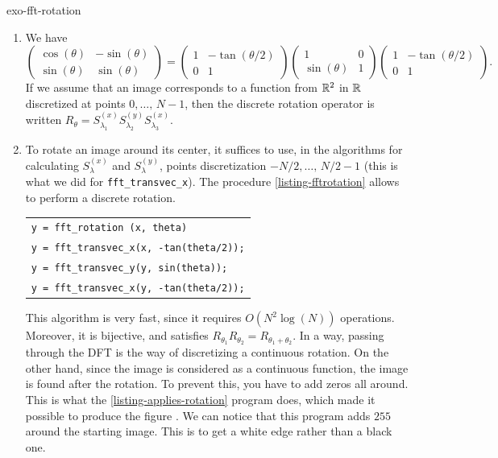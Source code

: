 \begin{correction}{exo-fft-rotation}
\begin{enumerate}
\item We have
\begin{equation*}
\begin{pmatrix} \cos (\theta) & - \sin(\theta) \\\sin(\theta) & \sin(\theta) \end{pmatrix} = \begin{pmatrix} 1 & - \tan(\theta/2) \\0 & 1 \end{pmatrix} \begin{pmatrix} 1 & 0 \\\sin(\theta) & 1 \end{pmatrix} \begin{pmatrix} 1 & - \tan( \theta/2) \\0 & 1 \end{pmatrix}.
\end{equation*}
If we assume that an image corresponds to a function from $ \mathbb{R}^2 $ in $ \mathbb{R} $ discretized at points $ 0, \ldots, \, N-1 $, then the discrete rotation operator is written $ R_\theta = S_{\lambda_1}^{(x)} S_{\lambda_2}^{(y)} S_{\lambda_3}^{(x)} $.
\item To rotate an image around its center, it suffices to use, in the algorithms for calculating $ S_\lambda^{(x)} $ and $ S_\lambda^{(y)} $, points discretization $ -N/2, \ldots, \, N/2-1 $ (this is what we did for \texttt{fft\_transvec\_x}). The procedure \ref{listing-fftrotation} allows to perform a discrete rotation.

\begin{listing} \begin{footnotesize}
{\upshape
\begin{tabular}{l} \texttt{\pfunction y = fft\_rotation (x, theta)} \\
\texttt{y = fft\_transvec\_x(x, -tan(theta/2));} \\
\texttt{y = fft\_transvec\_y(y, sin(theta));} \\
\texttt{y = fft\_transvec\_x(y, -tan(theta/2));} \\
\end{tabular}
} 
\end{footnotesize}
\caption{Procedure \texttt{\upshape fft\_rotation}}
\label{listing-fftrotation}
\end{listing}

This algorithm is very fast, since it requires $ O(N^2 \log (N)) $ operations. Moreover, it is bijective, and satisfies $ R_{\theta_1} R_{\theta_2} = R_{\theta_1 + \theta_2} $. In a way, passing through the DFT is the  way of discretizing a continuous rotation. On the other hand, since the image is considered as a continuous function, the image is found  after the rotation. To prevent this, you have to add zeros all around. This is what the \ref{listing-applies-rotation} program does, which made it possible to produce the figure . We can notice that this program adds $ 255 $ around the starting image. This is to get a white edge rather than a black one.


\end{enumerate}
\end{correction}
